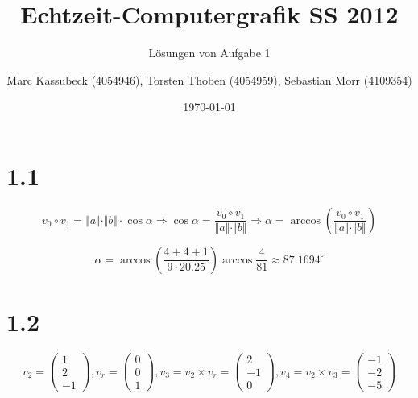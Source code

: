 \documentclass[a4paper]{scrartcl}
\title{Echtzeit-Computergrafik SS 2012}
\subtitle{Lösungen von Aufgabe 1}
\author{\small Marc Kassubeck (4054946), Torsten Thoben (4054959), Sebastian Morr (4109354)}
\date{\today}
\begin{document}
 

\maketitle

\section*{1.1}

\[
	v_0 \circ v_1 = \Vert a\Vert \cdot \Vert b\Vert \cdot \cos \alpha
	\Rightarrow \cos \alpha = \frac{v_0 \circ v_1}{\Vert a\Vert \cdot \Vert b\Vert}
	\Rightarrow \alpha = \arccos \left(\frac{v_0 \circ v_1}{\Vert a\Vert \cdot \Vert b\Vert}\right)
\]

\[
	\alpha = \arccos \left( \frac{4 + 4 + 1}{9 \cdot 20.25} \right) \arccos \frac{4}{81} \approx 87.1694^\circ
\]

\section*{1.2}


\[
	v_2 = \begin{pmatrix}
	1 \\ 2 \\ -1
	\end{pmatrix}, v_r = \begin{pmatrix}
	0 \\ 0 \\ 1
	\end{pmatrix}, v_3 = v_2 \times v_r = \begin{pmatrix}
	2 \\ -1 \\ 0
	\end{pmatrix},
	v_4 = v_2 \times v_3 = \begin{pmatrix}
	-1 \\ -2 \\ -5
	\end{pmatrix}
\]
\end{document}
